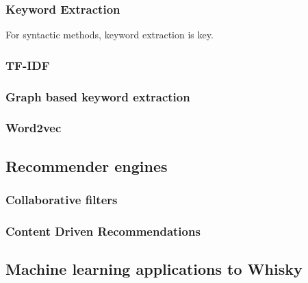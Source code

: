 \subsubsection{Keyword Extraction}\label{sssec:kwe}
For syntactic methods, keyword extraction is key.  
\subsubsection{TF-IDF}\label{ssec:tfidf}
\subsubsection{Graph based keyword extraction}\label{sssec:gbkwe}

\subsubsection{Word2vec}\label{ssec:w2v}
\subsection{Recommender engines}\label{ssec:recommenders}
\subsubsection{Collaborative filters}\label{sssec:collab}
\subsubsection{Content Driven Recommendations}\label{sssec:content}

\subsection{Machine learning applications to Whisky}\label{ssec:ml2whisk}


